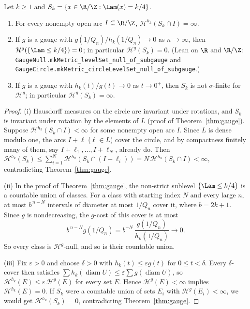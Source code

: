 \begin{corollary}\label{cor:exact-gauge}
Let $k\ge1$ and $S_k=\{x\in\R/\Z:\Lam(x)=k/4\}$.
\begin{enumerate}[label=(\roman*)]
\item For every nonempty open arc $I\subseteq\R/\Z$,
$\mathcal H^{h_k}(S_k\cap I)=\infty$.
\item If $g$ is a gauge with $g(1/Q_n)/h_k(1/Q_n)\to0$ as $n\to\infty$, then
$\mathcal H^{g}(\{\Lam\le k/4\})=0$; in particular $\mathcal H^g(S_k)=0$.
(Lean on $\R$ and $\R/\Z$: \texttt{GaugeNull.\allowbreak mkMetric\_\allowbreak levelSet\_\allowbreak null\_\allowbreak of\_\allowbreak subgauge} and \texttt{GaugeCircle.\allowbreak mkMetric\_\allowbreak circleLevelSet\_\allowbreak null\_\allowbreak of\_\allowbreak subgauge}.)
\item If $g$ is a gauge with $h_k(t)/g(t)\to0$ as $t\to0^+$, then $S_k$ is
not $\sigma$-finite for $\mathcal H^g$; in particular
$\mathcal H^g(S_k)=\infty$.
\end{enumerate}
\end{corollary}

\begin{proof}
(i) Hausdorff measures on the circle are invariant under rotations, and
$S_k$ is invariant under rotation by the elements of $L$ (proof of
Theorem~\ref{thm:gauge}). Suppose $\mathcal H^{h_k}(S_k\cap I)<\infty$ for
some nonempty open arc $I$. Since $L$ is dense modulo one, the arcs $I+\ell$
($\ell\in L$) cover the circle, and by compactness finitely many of them,
say $I+\ell_1,\ldots,I+\ell_N$, already do. Then
$\mathcal H^{h_k}(S_k)\le\sum_{i=1}^N\mathcal H^{h_k}(S_k\cap(I+\ell_i))
=N\,\mathcal H^{h_k}(S_k\cap I)<\infty$, contradicting
Theorem~\ref{thm:gauge}.

(ii) In the proof of Theorem~\ref{thm:gauge}, the non-strict sublevel
$\{\Lam\le k/4\}$ is a countable union of classes. For a class with
starting index $N$ and every large $n$, at most $b^{\,n-N}$ intervals of
diameter at most $1/Q_n$ cover it, where $b=2k+1$. Since $g$ is
nondecreasing, the $g$-cost of this cover is at most
\[
 b^{\,n-N}g(1/Q_n)=b^{-N}\,\frac{g(1/Q_n)}{h_k(1/Q_n)}\longrightarrow0 .
\]
So every class is $\mathcal H^g$-null, and so is their countable union.

(iii) Fix $\varepsilon>0$ and choose $\delta>0$ with
$h_k(t)\le\varepsilon g(t)$ for $0\le t<\delta$. Every $\delta$-cover then
satisfies $\sum h_k(\operatorname{diam}U)\le
\varepsilon\sum g(\operatorname{diam}U)$, so
$\mathcal H^{h_k}(E)\le\varepsilon\,\mathcal H^g(E)$ for every set $E$.
Hence $\mathcal H^g(E)<\infty$ implies $\mathcal H^{h_k}(E)=0$. If $S_k$
were a countable union of sets $E_i$ with $\mathcal H^g(E_i)<\infty$, we
would get $\mathcal H^{h_k}(S_k)=0$, contradicting Theorem~\ref{thm:gauge}.
\end{proof}

